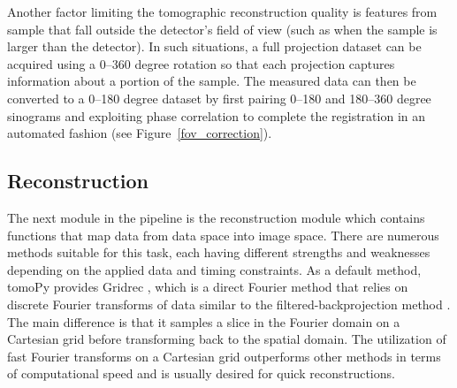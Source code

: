 \documentclass[pdf]{iucr}              %
\begin{document}
Another factor limiting the tomographic reconstruction quality is features from sample that fall outside the detector's field of view (such as when the sample is larger than the detector). In such situations, a full projection dataset can be acquired using a 0--360 degree rotation so that each projection captures information about a portion of the sample. The measured data can then be converted to a 0--180 degree dataset by first pairing 0--180 and 180--360 degree sinograms and exploiting phase correlation to complete the registration in an automated fashion (see Figure~\ref{fov_correction}). 

\subsection{Reconstruction}

The next module in the pipeline is the reconstruction module which contains functions that map data from data space into image space. There are numerous methods suitable for this task, each having different strengths and weaknesses depending on the applied data and timing constraints. As a default method, tomoPy provides Gridrec \cite{dowd}, which is a direct Fourier method that relies on discrete Fourier transforms of data similar to the filtered-backprojection method \cite{kak_slaney}. The main difference is that it samples a slice in the Fourier domain on a Cartesian grid before transforming back to the spatial domain. The utilization of fast Fourier transforms on a Cartesian grid outperforms other methods in terms of computational speed and is usually desired for quick reconstructions.
\end{document}
